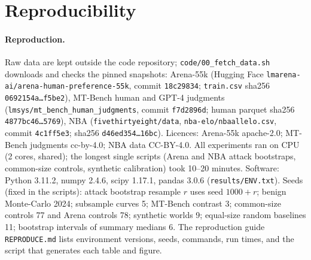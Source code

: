\documentclass{article}
\begin{document}
\section{Reproducibility}\label{app:repro}
\paragraph{Reproduction.} Raw data are kept outside the code repository; \texttt{code/00\_fetch\_data.sh} downloads and checks the pinned snapshots:
Arena-55k (Hugging Face \texttt{lmarena-ai/arena-human-preference-55k}, commit \texttt{18c29834}; \texttt{train.csv} sha256 \texttt{0692154a\dots f5be2}),
MT-Bench human and GPT-4 judgments (\texttt{lmsys/mt\_bench\_human\_judgments}, commit \texttt{f7d2896d}; human parquet sha256 \texttt{4877bc46\dots 5769}),
NBA (\texttt{fivethirtyeight/data}, \texttt{nba-elo/nbaallelo.csv}, commit \texttt{4c1ff5e3}; sha256 \texttt{d46ed354\dots 16bc}).
Licences: Arena-55k apache-2.0; MT-Bench judgments cc-by-4.0; NBA data CC-BY-4.0. All experiments ran on CPU (2 cores, shared); the longest single scripts (Arena and NBA attack bootstraps, common-size controls, synthetic calibration) took 10--20 minutes. Software: Python 3.11.2, numpy 2.4.6, scipy 1.17.1, pandas 3.0.6 (\texttt{results/ENV.txt}). Seeds (fixed in the scripts): attack bootstrap resample $r$ uses seed $1000+r$; benign Monte-Carlo 2024; subsample curves 5; MT-Bench contrast 3; common-size controls 77 and Arena controls 78; synthetic worlds 9; equal-size random baselines 11; bootstrap intervals of summary medians 6. The reproduction guide \texttt{REPRODUCE.md} lists environment versions, seeds, commands, run times, and the script that generates each table and figure.


\end{document}
